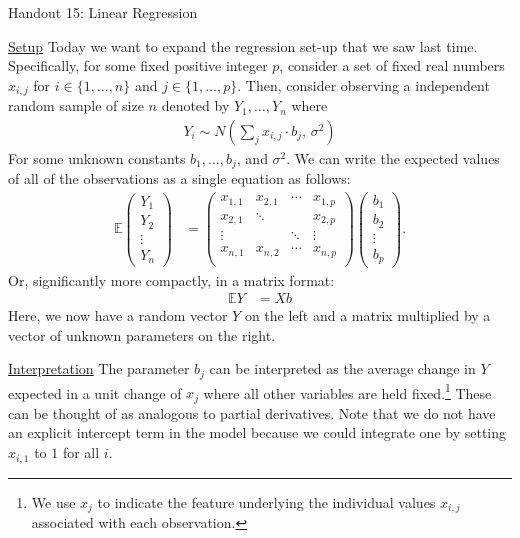 \documentclass{tufte-handout}
\begin{document}
\justify

{\LARGE Handout 15: Linear Regression}

\vspace*{18pt}

\noindent
\underline{Setup}
Today we want to expand the regression set-up that we saw last time.
Specifically, for some fixed positive integer $p$, consider a set of
fixed real numbers $x_{i, j}$ for $i \in \{1, \ldots, n\}$ and
$j \in \{1, \ldots, p\}$. Then, consider observing a independent random
sample of size $n$ denoted by $Y_1, \ldots, Y_n$ where
\begin{align*}
Y_i \sim N(\sum_{j} x_{i, j} \cdot b_j, \, \sigma^2)
\end{align*}
For some unknown constants $b_1, \ldots, b_j$, and $\sigma^2$. We can
write the expected values of all of the observations as a single equation
as follows:
\begin{align*}
\mathbb{E} \left(\begin{array}{c}Y_1\\ Y_2\\ \vdots\\ Y_n\end{array}\right) &=
  \left(\begin{array}{cccc}x_{1,1}&x_{2,1}&\cdots&x_{1,p}\\
                           x_{2,1}&\ddots&&x_{2,p}\\
                           \vdots&&\ddots&\vdots\\
                           x_{n,1}&x_{n,2}&\cdots&x_{n,p}\\\end{array}\right)
  \left(\begin{array}{c}b_1\\ b_2\\ \vdots\\ b_p\end{array}\right).
\end{align*}
Or, significantly more compactly, in a matrix format:
\begin{align*}
\mathbb{E} Y &= X b
\end{align*}
Here, we now have a random vector $Y$ on the left and a matrix multiplied
by a vector of unknown parameters on the right.

\vspace*{12pt}

\noindent
\underline{Interpretation}
The parameter $b_j$ can be interpreted as the average change in $Y$
expected in a unit change of $x_{j}$ where all other variables are held
fixed.\footnote{We use $x_{j}$ to indicate the feature underlying the
individual values $x_{i,j}$ associated with each observation.} These
can be thought of as analogous to partial derivatives. Note that we do
not have an explicit intercept term in the model because we could integrate
one by setting $x_{i,1}$ to $1$ for all $i$.
\end{document}
